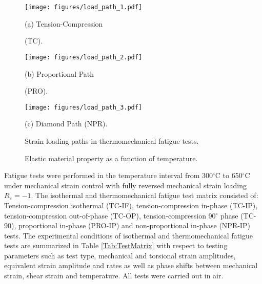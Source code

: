 \documentclass[preprint,5p,twocolumn,11pt,sort&compress]{elsarticle}
\begin{document}
\begin{figure}
  \begin{minipage}[t]{0.5\linewidth}
  \nonumber
    \centering
    \texttt{[image: figures/load\_path\_1.pdf]}
    \centerline{\small (a) Tension-Compression}
    \centerline{\small (TC).}
  \end{minipage}%
  \begin{minipage}[t]{0.5\linewidth}
    \centering
    \texttt{[image: figures/load\_path\_2.pdf]}
    \centerline{\small (b) Proportional Path}
    \centerline{\small (PRO).}
  \end{minipage}
  \centering
  \begin{minipage}[t]{0.5\linewidth}
  \nonumber
    \centering
    \texttt{[image: figures/load\_path\_3.pdf]}
    \centerline{\small (c) Diamond Path (NPR).}
  \end{minipage}%
  \caption{Strain loading paths in thermomechanical fatigue tests.}
  \label{Fig:LoadPath}
\end{figure}

\begin{figure}[!htp]
\caption{Elastic material property as a function of temperature.}
\label{Fig:plot_elastic_by_temperature_in718}
\end{figure}

Fatigue tests were performed in the temperature interval from 300$^\circ$C to 650$^\circ$C under mechanical strain control with fully reversed mechanical strain loading $R_{\varepsilon}=-1$. The isothermal and thermomechanical fatigue test matrix consisted of: Tension-compression isothermal (TC-IF), tension-compression in-phase (TC-IP), tension-compression out-of-phase (TC-OP), tension-compression 90$^\circ$ phase (TC-90), proportional in-phase (PRO-IP) and non-proportional in-phase (NPR-IP) tests. The experimental conditions of isothermal and thermomechanical fatigue tests are summarized in Table \ref{Tab:TestMatrix} with respect to testing parameters such as test type, mechanical and torsional strain amplitudes, equivalent strain amplitude and rates as well as phase shifts between mechanical strain, shear strain and temperature. All tests were carried out in air. 
\end{document}
